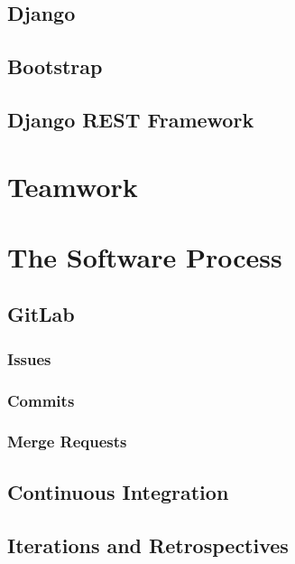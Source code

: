 \documentclass{l3proj}
\begin{document}
\subsection{Django}

\subsection{Bootstrap}

\subsection{Django REST Framework}


\section{Teamwork}


\section{The Software Process}

\subsection{GitLab}

\subsubsection{Issues}

\subsubsection{Commits}

\subsubsection{Merge Requests}


\subsection{Continuous Integration}

\subsection{Iterations and Retrospectives}
\end{document}

